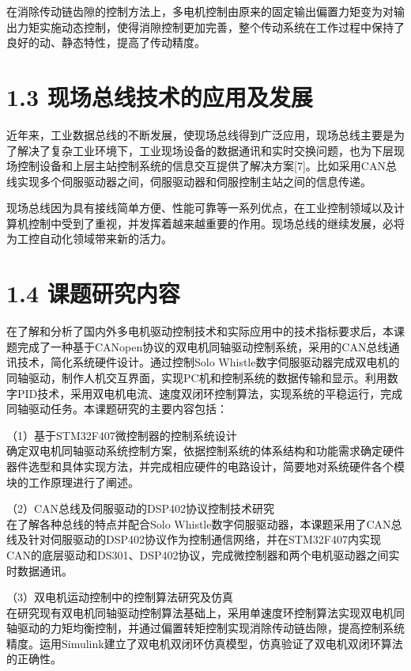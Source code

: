 \documentclass[UTF8,zihao=-4,openany,oneside]{ctexbook}
\begin{document}
在消除传动链齿隙的控制方法上，多电机控制由原来的固定输出偏置力矩变为对输出力矩实施动态控制，使得消隙控制更加完善，整个传动系统在工作过程中保持了良好的动、静态特性，提高了传动精度。

\section{1.3 现场总线技术的应用及发展}

近年来，工业数据总线的不断发展，使现场总线得到广泛应用，现场总线主要是为了解决了复杂工业环境下，工业现场设备的数据通讯和实时交换问题，也为下层现场控制设备和上层主站控制系统的信息交互提供了解决方案[7]。比如采用CAN总线实现多个伺服驱动器之间，伺服驱动器和伺服控制主站之间的信息传递。

现场总线因为具有接线简单方便、性能可靠等一系列优点，在工业控制领域以及计算机控制中受到了重视，并发挥着越来越重要的作用。现场总线的继续发展，必将为工控自动化领域带来新的活力。

\section{1.4 课题研究内容}

在了解和分析了国内外多电机驱动控制技术和实际应用中的技术指标要求后，本课题完成了一种基于CANopen协议的双电机同轴驱动控制系统，采用的CAN总线通讯技术，简化系统硬件设计。通过控制Solo Whistle数字伺服驱动器完成双电机的同轴驱动，制作人机交互界面，实现PC机和控制系统的数据传输和显示。利用数字PID技术，采用双电机电流、速度双闭环控制算法，实现系统的平稳运行，完成同轴驱动任务。本课题研究的主要内容包括：

\noindent （1）基于STM32F407微控制器的控制系统设计\\

确定双电机同轴驱动系统控制方案，依据控制系统的体系结构和功能需求确定硬件器件选型和具体实现方法，并完成相应硬件的电路设计，简要地对系统硬件各个模块的工作原理进行了阐述。

\noindent （2）CAN总线及伺服驱动的DSP402协议控制技术研究\\

在了解各种总线的特点并配合Solo Whistle数字伺服驱动器，本课题采用了CAN总线及针对伺服驱动的DSP402协议作为控制通信网络，并在STM32F407内实现CAN的底层驱动和DS301、DSP402协议，完成微控制器和两个电机驱动器之间实时数据通讯。

\noindent （3）双电机运动控制中的控制算法研究及仿真\\

在研究现有双电机同轴驱动控制算法基础上，采用单速度环控制算法实现双电机同轴驱动的力矩均衡控制，并通过偏置转矩控制实现消除传动链齿隙，提高控制系统精度。运用Simulink建立了双电机双闭环仿真模型，仿真验证了双电机双闭环算法的正确性。
\end{document}
